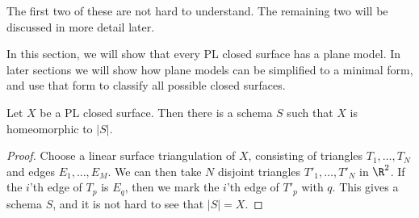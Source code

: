 \begin{example}
\begin{center}
 \end{center}
 The first two of these are not hard to understand.  The remaining two
 will be discussed in more detail later.
\end{example}

In this section, we will show that every PL closed surface has a plane
model.  In later sections we will show how plane models can be
simplified to a minimal form, and use that form to classify all
possible closed surfaces.

\begin{proposition}\label{prop-schema-exists}
 Let $X$ be a PL closed surface.  Then there is a schema $S$ such that
 $X$ is homeomorphic to $|S|$.
\end{proposition}
\begin{proof}
 Choose a linear surface triangulation of $X$, consisting of triangles
 $T_1,\dotsc,T_N$ and edges $E_1,\dotsc,E_M$.  We can then take $N$
 disjoint triangles $T'_1,\dotsc,T'_N$ in $\R^2$.  If the $i$'th edge
 of $T_p$ is $E_q$, then we mark the $i$'th edge of $T'_p$ with $q$.
 This gives a schema $S$, and it is not hard to see that $|S|=X$.
\end{proof}

